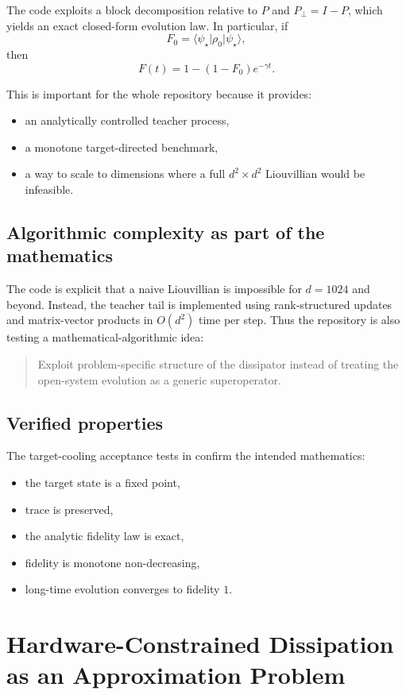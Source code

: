 \documentclass[11pt,a4paper]{article}
\begin{document}
The code exploits a block decomposition relative to $P$ and $P_\perp = I-P$, which yields an exact closed-form evolution law. In particular, if
\[
F_0 = \langle \psi_\star \rvert \rho_0 \lvert \psi_\star \rangle,
\]
then
\[
F(t) = 1 - (1-F_0)e^{-\gamma t}.
\]

This is important for the whole repository because it provides:
\begin{itemize}
  \item an analytically controlled teacher process,
  \item a monotone target-directed benchmark,
  \item a way to scale to dimensions where a full $d^2\times d^2$ Liouvillian would be infeasible.
\end{itemize}

\subsection{Algorithmic complexity as part of the mathematics}
The code is explicit that a naive Liouvillian is impossible for $d=1024$ and beyond. Instead, the teacher tail is implemented using rank-structured updates and matrix-vector products in $O(d^2)$ time per step. Thus the repository is also testing a mathematical-algorithmic idea:
\begin{quote}
Exploit problem-specific structure of the dissipator instead of treating the open-system evolution as a generic superoperator.
\end{quote}

\subsection{Verified properties}
The target-cooling acceptance tests in  confirm the intended mathematics:
\begin{itemize}
  \item the target state is a fixed point,
  \item trace is preserved,
  \item the analytic fidelity law is exact,
  \item fidelity is monotone non-decreasing,
  \item long-time evolution converges to fidelity $1$.
\end{itemize}

\section{Hardware-Constrained Dissipation as an Approximation Problem}
\end{document}
